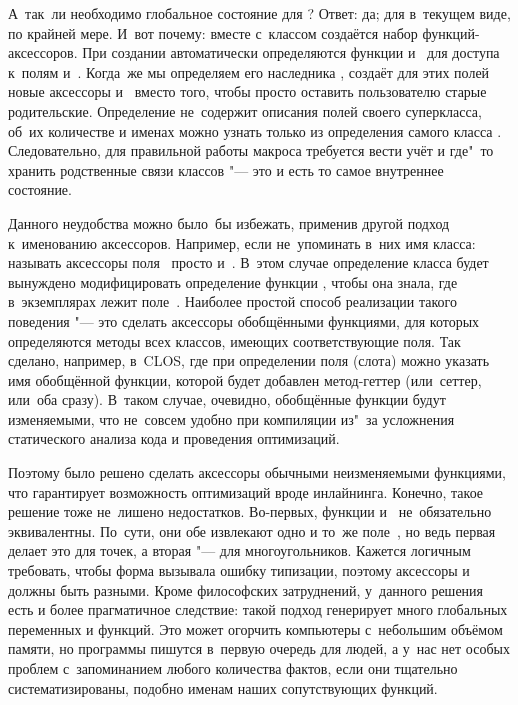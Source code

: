 А~так~ли необходимо глобальное состояние для ? Ответ: да; для
{\Meroonet} в~текущем виде, по крайней мере. И~вот почему: вместе с~классом
создаётся набор функций-аксессоров. При создании  автоматически
определяются функции  и~ для доступа к~полям 
и~. Когда~же мы определяем его наследника , {\Meroonet}
создаёт для этих полей новые аксессоры  и~ вместо
того, чтобы просто оставить пользователю старые родительские. Определение
 не~содержит описания полей своего суперкласса, об~их количестве и
именах можно узнать только из определения самого класса .
Следовательно, для правильной работы макроса  требуется вести
учёт и где"~то хранить родственные связи классов "--- это и есть то самое
внутреннее состояние.

Данного неудобства можно было~бы избежать, применив другой подход к~именованию
аксессоров. Например, если не~упоминать в~них имя класса: называть аксессоры
поля~ просто  и~. В~этом случае определение класса
 будет вынуждено модифицировать определение функции ,
чтобы она знала, где в~экземплярах  лежит поле~. Наиболее
простой способ реализации такого поведения "--- это сделать аксессоры
обобщёнными функциями, для которых определяются методы всех классов, имеющих
соответствующие поля. Так сделано, например, в~CLOS, где при определении поля
(слота) можно указать имя обобщённой функции, которой будет добавлен
метод-геттер (или~сеттер, или~оба сразу). В~таком случае, очевидно, обобщённые
функции будут изменяемыми, что не~совсем удобно при компиляции из"~за усложнения
статического анализа кода и проведения оптимизаций.

Поэтому было решено сделать аксессоры обычными неизменяемыми функциями, что
гарантирует возможность оптимизаций вроде инлайнинга. Конечно, такое решение
тоже не~лишено недостатков. Во-первых, функции  и~
не~обязательно эквивалентны. По~сути, они обе извлекают одно и то~же
поле~, но ведь первая делает это для точек, а вторая "--- для
многоугольников. Кажется логичным требовать, чтобы форма  вызывала ошибку типизации, поэтому аксессоры 
и~ должны быть разными. Кроме философских затруднений, у~данного
решения есть и более прагматичное следствие: такой подход генерирует много
глобальных переменных и функций. Это может огорчить компьютеры с~небольшим
объёмом памяти, но программы пишутся в~первую очередь для людей, а у~нас нет
особых проблем с~запоминанием любого количества фактов, если они тщательно
систематизированы, подобно именам наших сопутствующих функций.


